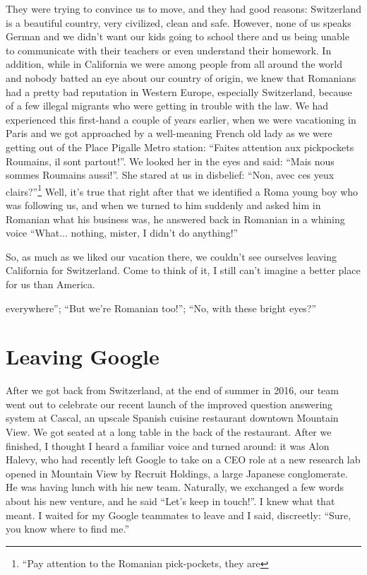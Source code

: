 \documentclass[12pt]{book}
\begin{document}
They were trying to convince us to move, and they had good reasons:
Switzerland is a beautiful country, very civilized, clean and safe.
However, none of us speaks German and we didn't want our kids going to
school there and us being unable to communicate with their teachers or
even understand their homework. In addition, while in California we were
among people from all around the world and nobody batted an eye about
our country of origin, we knew that Romanians had a pretty bad
reputation in Western Europe, especially Switzerland, because of a few
illegal migrants who were getting in trouble with the law. We had
experienced this first-hand a couple of years earlier, when we were
vacationing in Paris and we got approached by a well-meaning French old
lady as we were getting out of the Place Pigalle Metro station: ``Faites
attention aux pickpockets Roumains, il sont partout!''. We looked her in
the eyes and said: ``Mais nous sommes Roumains aussi!''. She stared at
us in disbelief: ``Non, avec ces yeux
clairs?''\footnote{
  ``Pay attention to the Romanian pick-pockets, they are} Well, it's
true that right after that we identified a Roma young boy who was
following us, and when we turned to him suddenly and asked him in
Romanian what his business was, he answered back in Romanian in a
whining voice ``What... nothing, mister, I didn't do anything!''

So, as much as we liked our vacation there, we couldn't see ourselves
leaving California for Switzerland. Come to think of it, I still can't
imagine a better place for us than America.

everywhere''; ``But we're Romanian too!''; ``No, with these bright
eyes?''


\section{Leaving Google}

After we got back from Switzerland, at the end of summer in 2016, our
team went out to celebrate our recent launch of the improved question
answering system at Cascal, an upscale Spanish cuisine restaurant
downtown Mountain View. We got seated at a long table in the back of the
restaurant. After we finished, I thought I heard a familiar voice and
turned around: it was Alon Halevy, who had recently left Google to take
on a CEO role at a new research lab opened in Mountain View by Recruit
Holdings, a large Japanese conglomerate. He was having lunch with his
new team. Naturally, we exchanged a few words about his new venture, and
he said ``Let's keep in touch!''. I knew what that meant. I waited for
my Google teammates to leave and I said, discreetly: ``Sure, you know
where to find me.''
\end{document}
